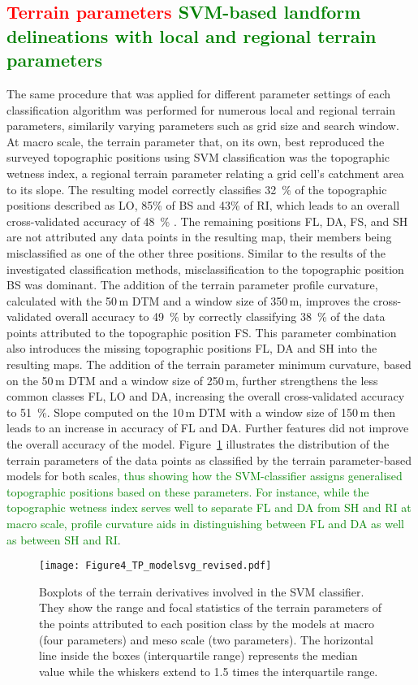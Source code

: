 \documentclass[preprint,12pt,authoryear]{elsarticle}
\begin{document}
\subsection{\textcolor{red}{Terrain parameters} \textcolor{green}{SVM-based landform delineations with local and regional terrain parameters}}
The same procedure that was applied for different parameter settings of each classification algorithm was performed for  numerous local and regional terrain parameters, similarily varying parameters such as grid size and search window. At macro scale, the terrain parameter that, on its own, best reproduced the surveyed topographic positions using SVM classification was the topographic wetness index, a regional terrain parameter relating a grid cell's catchment area to its slope. The resulting model correctly classifies 32~\% of the topographic positions described as LO, 85\% of BS and 43\% of RI, which leads to an overall cross-validated accuracy of 48~\% . The remaining positions FL, DA, FS, and SH are not attributed any data points in the resulting map, their members being misclassified as one of the other three positions. Similar to the results of the investigated classification methods, misclassification to the topographic position BS was dominant. The addition of the terrain parameter profile curvature, calculated with the 50\,m DTM and a window size of 350\,m, improves the cross-validated overall accuracy to 49~\% by correctly classifying 38~\% of the data points attributed to the topographic position FS. This parameter combination also introduces the missing topographic positions FL, DA and SH into the resulting maps. The addition of the terrain parameter minimum curvature, based on the 50\,m DTM and a window size of 250\,m, further strengthens the less common classes FL, LO and DA, increasing the overall cross-validated accuracy to 51~\%. Slope computed on the 10\,m DTM with a window size of 150\,m then leads to an increase in accuracy of FL and DA. Further features did not improve the overall accuracy of the model. Figure~\ref{fig:tp_model} illustrates the distribution of the terrain parameters of the data points as classified by the terrain parameter-based models for both scales\textcolor{green}{, thus showing how the SVM-classifier assigns generalised topographic positions based on these parameters. For instance, while the topographic wetness index serves well to separate FL and DA from SH and RI at macro scale, profile curvature aids in distinguishing between FL and DA as well as between SH and RI}. 

\begin{figure}
\texttt{[image: Figure4\_TP\_modelsvg\_revised.pdf]}
\caption{Boxplots of the terrain derivatives involved in the SVM classifier. They show the range and focal statistics of the terrain parameters of the points attributed to each position class by the models at macro (four parameters) and meso scale (two parameters). The horizontal line inside the boxes (interquartile range) represents the median value while the whiskers extend to 1.5 times the interquartile range.}
\label{fig:tp_model}
\end{figure}
\end{document}

